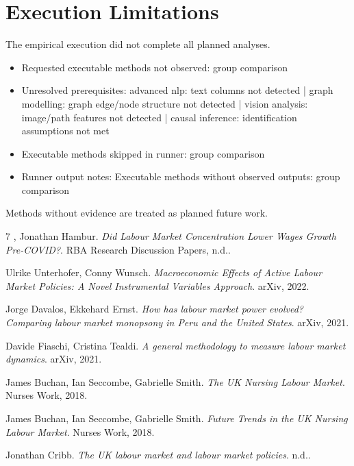 \documentclass[11pt,a4paper]{article}
\begin{document}
\section*{Execution Limitations}
The empirical execution did not complete all planned analyses.
\begin{itemize}
  \item Requested executable methods not observed: group comparison
  \item Unresolved prerequisites: advanced nlp: text columns not detected | graph modelling: graph edge/node structure not detected | vision analysis: image/path features not detected | causal inference: identification assumptions not met
  \item Executable methods skipped in runner: group comparison
  \item Runner output notes: Executable methods without observed outputs: group comparison
\end{itemize}
Methods without evidence are treated as planned future work.



\begin{thebibliography}{7}
 , Jonathan Hambur. \textit{Did Labour Market Concentration Lower Wages Growth Pre-COVID?}. RBA Research Discussion Papers, n.d..

 Ulrike Unterhofer, Conny Wunsch. \textit{Macroeconomic Effects of Active Labour Market Policies: A Novel Instrumental Variables Approach}. arXiv, 2022.

 Jorge Davalos, Ekkehard Ernst. \textit{How has labour market power evolved? Comparing labour market monopsony in Peru and the United States}. arXiv, 2021.

 Davide Fiaschi, Cristina Tealdi. \textit{A general methodology to measure labour market dynamics}. arXiv, 2021.

 James Buchan, Ian Seccombe, Gabrielle Smith. \textit{The UK Nursing Labour Market}. Nurses Work, 2018.

 James Buchan, Ian Seccombe, Gabrielle Smith. \textit{Future Trends in the UK Nursing Labour Market}. Nurses Work, 2018.

 Jonathan Cribb. \textit{The UK labour market and labour market policies}. n.d..
\end{thebibliography}
\end{document}
